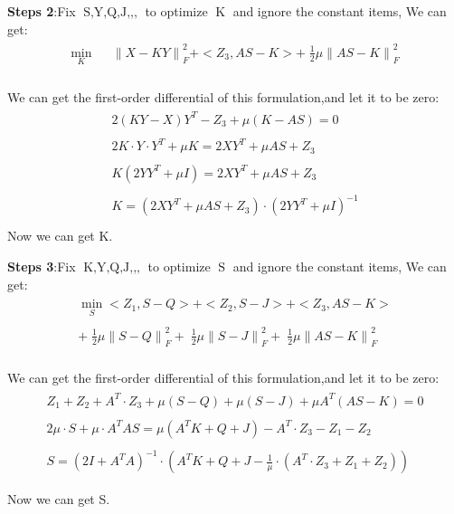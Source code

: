 \documentclass{article}
\begin{document}
\begin{flushleft}
\textbf{Steps 2}:\;\;Fix $\mathop{S,Y,Q,J,Z_1,Z_2,Z_3}$ to optimize $\mathop{K}$ and ignore the constant items, We can get:
\begin{eqnarray}
\begin{array}{lll}
    \mathop{\min}\limits_{K} && {\parallel X - KY\parallel}_F^2 + <Z_3,AS-K>  +\; \frac{1}{2}\mu{\parallel AS - K \parallel}_F^2
\end{array}
\end{eqnarray}\\
We can get the first-order differential of this formulation,and let it to be zero:
\begin{eqnarray}
\begin{array}{lll}
    2(KY - X)Y^T  - Z_3 + \mu (K-AS) = 0 \nonumber \\\\
    2K\cdot Y\cdot Y^T + \mu K = 2XY^T + \mu AS +Z_3\\\\
    K(2 YY^T +\mu I) = 2XY^T + \mu AS + Z_3\\\\
    K = (2XY^T + \mu AS +Z_3) \cdot (2YY^T +\mu I)^{-1}\\
\end{array}
\end{eqnarray}
Now we can get K.\\
\end{flushleft}

\begin{flushleft}
\textbf{Steps 3}:\;\;Fix $\mathop{K,Y,Q,J,Z_1,Z_2,Z_3}$ to optimize $\mathop{S}$ and ignore the constant items, We can get:
\begin{eqnarray}
\begin{array}{lll}
    \mathop{\min}\limits_{S} <Z_1,S-Q> + <Z_2,S-J> + <Z_3,AS-K> \\\\ +\;\frac{1}{2}\mu{\parallel S - Q\parallel}_F^2 +\;\frac{1}{2}\mu{\parallel S - J \parallel}_F^2
    +\;\frac{1}{2}\mu{\parallel AS - K \parallel}_F^2
\end{array}
\end{eqnarray}\\
We can get the first-order differential of this formulation,and let it to be zero:
\begin{eqnarray}
\begin{array}{lll}
    Z_1 + Z_2 + A^T\cdot Z_3 + \mu(S-Q) + \mu(S-J) +\mu A^T(AS-K) = 0 \nonumber \\\\
    2\mu \cdot S+ \mu\cdot A^T AS = \mu (A^TK+Q+J) - A^T\cdot Z_3 -Z_1-Z_2\\\\
    S = (2I+A^TA)^{-1} \cdot (A^TK + Q +J - \frac{1}{\mu} \cdot  (A^T \cdot Z_3+Z_1 +Z_2))\\\\
\end{array}
\end{eqnarray}
Now we can get S.\\
\end{flushleft}
\end{document}
